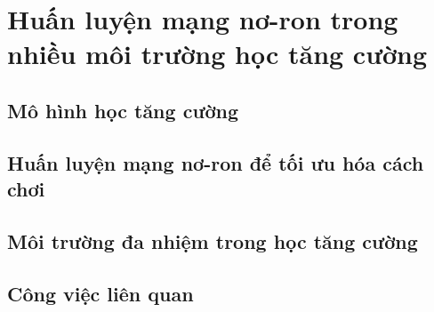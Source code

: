\chapter{Huấn luyện mạng nơ-ron trong nhiều môi trường học tăng cường}
\label{chap:problem_rl}
\section{Mô hình học tăng cường}

\newpage
\section{Huấn luyện mạng nơ-ron để tối ưu hóa cách chơi}

\newpage
\section{Môi trường đa nhiệm trong học tăng cường}

\newpage
\section{Công việc liên quan}
